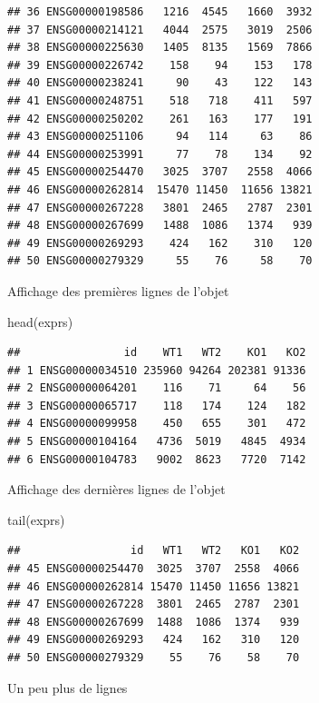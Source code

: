 \documentclass[
]{book}
\newenvironment{Shaded}{\begin{snugshade}}{\end{snugshade}}
\newcommand{\FunctionTok}[1]{\textcolor[rgb]{0.00,0.00,0.00}{#1}}
\newcommand{\NormalTok}[1]{#1}
\begin{document}
\begin{verbatim}
## 36 ENSG00000198586   1216  4545   1660  3932
## 37 ENSG00000214121   4044  2575   3019  2506
## 38 ENSG00000225630   1405  8135   1569  7866
## 39 ENSG00000226742    158    94    153   178
## 40 ENSG00000238241     90    43    122   143
## 41 ENSG00000248751    518   718    411   597
## 42 ENSG00000250202    261   163    177   191
## 43 ENSG00000251106     94   114     63    86
## 44 ENSG00000253991     77    78    134    92
## 45 ENSG00000254470   3025  3707   2558  4066
## 46 ENSG00000262814  15470 11450  11656 13821
## 47 ENSG00000267228   3801  2465   2787  2301
## 48 ENSG00000267699   1488  1086   1374   939
## 49 ENSG00000269293    424   162    310   120
## 50 ENSG00000279329     55    76     58    70
\end{verbatim}

Affichage des premières lignes de l'objet

\begin{Shaded}
\begin{Highlighting}[]
\FunctionTok{head}\NormalTok{(exprs)}
\end{Highlighting}
\end{Shaded}

\begin{verbatim}
##                id    WT1   WT2    KO1   KO2
## 1 ENSG00000034510 235960 94264 202381 91336
## 2 ENSG00000064201    116    71     64    56
## 3 ENSG00000065717    118   174    124   182
## 4 ENSG00000099958    450   655    301   472
## 5 ENSG00000104164   4736  5019   4845  4934
## 6 ENSG00000104783   9002  8623   7720  7142
\end{verbatim}

Affichage des dernières lignes de l'objet

\begin{Shaded}
\begin{Highlighting}[]
\FunctionTok{tail}\NormalTok{(exprs)}
\end{Highlighting}
\end{Shaded}

\begin{verbatim}
##                 id   WT1   WT2   KO1   KO2
## 45 ENSG00000254470  3025  3707  2558  4066
## 46 ENSG00000262814 15470 11450 11656 13821
## 47 ENSG00000267228  3801  2465  2787  2301
## 48 ENSG00000267699  1488  1086  1374   939
## 49 ENSG00000269293   424   162   310   120
## 50 ENSG00000279329    55    76    58    70
\end{verbatim}

Un peu plus de lignes
\end{document}
